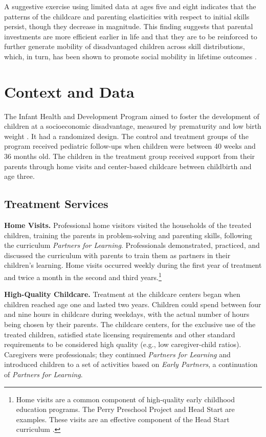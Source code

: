 A suggestive exercise using limited data at ages five and eight indicates that the patterns of the childcare and parenting elasticities with respect to initial skills persist, though they decrease in magnitude. This finding suggests that parental investments are more efficient earlier in life and that they are to be reinforced to further generate mobility of disadvantaged children across skill distributions, which, in turn, has been shown to promote social mobility in lifetime outcomes \citep[e.g.,][]{heckmanUnderstandingMechanismsWhich2013b}.

\section{ Context and Data} \label{section:program}

\noindent The Infant Health and Development Program \citep{ramey1992infant} aimed to foster the development of children at a socioeconomic disadvantage, measured by prematurity and low birth weight \citep{gross1997helping}. It had a randomized design. The control and treatment groups of the program received pediatric follow-ups when children were between 40 weeks and 36 months old. The children in the treatment group received support from their parents through home visits and center-based childcare between childbirth and age three.

\subsection{ Treatment Services} 

\noindent \textbf{Home Visits.} Professional home visitors visited the households of the treated children, training the parents in problem-solving and parenting skills, following the curriculum \textit{Partners for Learning}. Professionals demonstrated, practiced, and discussed the curriculum with parents to train them as partners in their children's learning. Home visits occurred weekly during the first year of treatment and twice a month in the second and third years.\footnote{Home visits are a common component of high-quality early childhood education programs. The Perry Preschool Project and Head Start are examples. These visits are an effective component of the Head Start curriculum \citep{waltersInputsProductionEarly2015a}.}

\noindent \textbf{High-Quality Childcare.} Treatment at the childcare centers began when children reached age one and lasted two years. Children could spend between four and nine hours in childcare during weekdays, with the actual number of hours being chosen by their parents. The childcare centers, for the exclusive use of the treated children, satisfied state licensing requirements and other standard requirements to be considered high quality (e.g., low caregiver-child ratios). Caregivers were professionals; they continued \textit{Partners for Learning} and introduced children to a set of activities based on \textit{Early Partners}, a continuation of \textit{Partners for Learning}.


